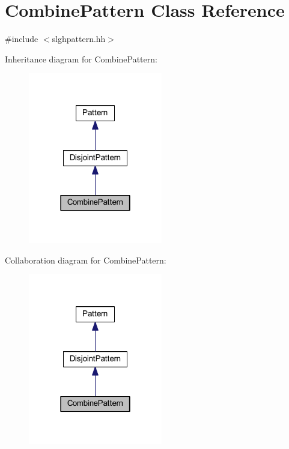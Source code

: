 \hypertarget{class_combine_pattern}{}\section{Combine\+Pattern Class Reference}
\label{class_combine_pattern}


{\ttfamily \#include $<$slghpattern.\+hh$>$}



Inheritance diagram for Combine\+Pattern\+:
\nopagebreak
\begin{figure}[H]
\begin{center}
\leavevmode
\includegraphics[width=166pt]{class_combine_pattern__inherit__graph}
\end{center}
\end{figure}


Collaboration diagram for Combine\+Pattern\+:
\nopagebreak
\begin{figure}[H]
\begin{center}
\leavevmode
\includegraphics[width=166pt]{class_combine_pattern__coll__graph}
\end{center}
\end{figure}
